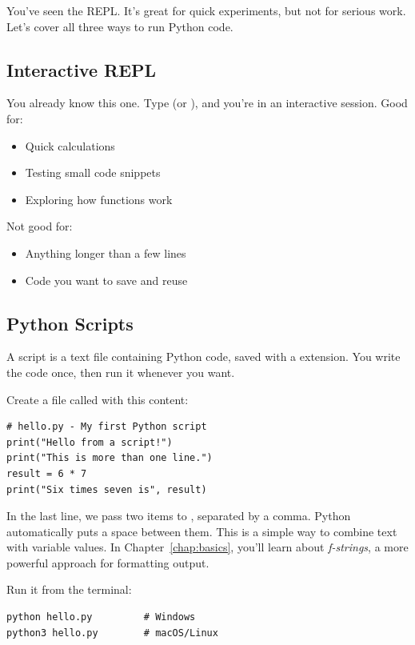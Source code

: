 You've seen the REPL. It's great for quick experiments, but not for serious work. Let's cover all three ways to run Python code.

\subsection{Interactive REPL}

You already know this one. Type  (or ), and you're in an interactive session. Good for:
\begin{itemize}
    \item Quick calculations
    \item Testing small code snippets
    \item Exploring how functions work
\end{itemize}

Not good for:
\begin{itemize}
    \item Anything longer than a few lines
    \item Code you want to save and reuse
\end{itemize}

\subsection{Python Scripts}

A script is a text file containing Python code, saved with a  extension. You write the code once, then run it whenever you want.

Create a file called  with this content:

\begin{lstlisting}
# hello.py - My first Python script
print("Hello from a script!")
print("This is more than one line.")
result = 6 * 7
print("Six times seven is", result)
\end{lstlisting}

\begin{note}
In the last line, we pass two items to , separated by a comma. Python automatically puts a space between them. This is a simple way to combine text with variable values. In Chapter~\ref{chap:basics}, you'll learn about \emph{f-strings}, a more powerful approach for formatting output.
\end{note}

Run it from the terminal:

\begin{lstlisting}[style=shellstyle]
python hello.py         # Windows
python3 hello.py        # macOS/Linux
\end{lstlisting}

